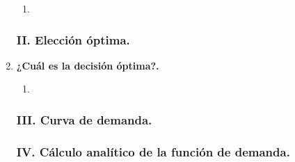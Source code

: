 \begin{enumerate}
\begin{enumerate}[\bfseries (3.1)]
		\item 

	    \end{enumerate}


\subsubsection*{\center II. Elección óptima.}
\vspace{.5cm}

    \item \textbf{¿Cuál es la decisión óptima?.}\\

	\begin{enumerate}[\bfseries (4.1)]

	    \item 

	\end{enumerate}

\subsubsection*{\center III. Curva de demanda.}
\vspace{.5cm}

\subsubsection*{\center IV. Cálculo analítico de la función de demanda.}
\vspace{.5cm}

\end{enumerate}
